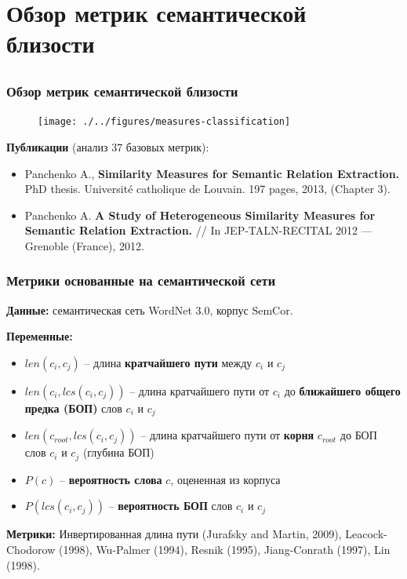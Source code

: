 \documentclass{beamer}
\begin{document}
\section[Обзор метрик]{Обзор метрик семантической близости} 
\subsection{  }

\begin{frame}
\frametitle{Обзор метрик семантической близости}

\begin{figure}
\texttt{[image: ./../figures/measures-classification]}
\end{figure}

\textbf{Публикации} (анализ 37 базовых метрик):
\begin{itemize}
\item Panchenko A., \textbf{Similarity Measures for Semantic Relation Extraction.} PhD thesis. Universit\'{e} catholique de Louvain. 197
pages, 2013, (Chapter 3). 
\item Panchenko A. \textbf{A Study of Heterogeneous Similarity Measures for Semantic Relation Extraction.} // In JEP-TALN-RECITAL 2012 — Grenoble (France), 2012. 
\end{itemize}
 
\end{frame}



\begin{frame}
\frametitle{Метрики основанные на семантической сети}

 \textbf{Данные:} семантическая сеть WordNet 3.0, корпус SemCor.
	
 \textbf{Переменные:}
\begin{itemize}
\item $len(c_i,c_j)$ -- длина \textbf{кратчайшего пути} между $c_i$ и $c_j$
\item  $len(c_i, lcs(c_i,c_j))$ -- длина кратчайшего пути от $c_i$ до \textbf{ближайшего общего предка  (БОП)} слов $c_i$ и $c_j$
\item $len(c_{root}, lcs(c_i,c_j))$ -- длина кратчайшего пути от \textbf{корня} $c_{root}$ до БОП слов $c_i$ и $c_j$ (глубина БОП)
\item $P(c)$ --  \textbf{вероятность слова} $c$, оцененная из корпуса
\item  $P(lcs(c_i, c_j))$ -- \textbf{вероятность БОП} слов $c_i$ и $c_j$
\end{itemize}
	
 \textbf{Метрики:} Инвертированная длина пути (Jurafsky and Martin, 2009), Leacock-Chodorow (1998), Wu-Palmer (1994), 
 Resnik (1995), Jiang-Conrath (1997), Lin (1998).
  
\end{frame}
\end{document}
